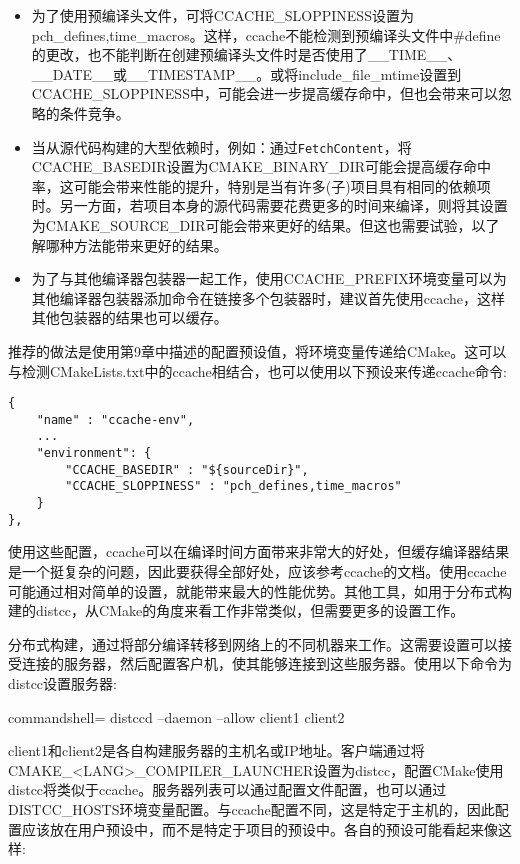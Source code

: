 \begin{itemize}
\item 
为了使用预编译头文件，可将CCACHE\_SLOPPINESS设置为pch\_defines,time\_macros。这样，ccache不能检测到预编译头文件中\#define的更改，也不能判断在创建预编译头文件时是否使用了\_\_TIME\_\_、\_\_DATE\_\_或\_\_TIMESTAMP\_\_。或将include\_file\_mtime设置到CCACHE\_SLOPPINESS中，可能会进一步提高缓存命中，但也会带来可以忽略的条件竞争。

\item 
当从源代码构建的大型依赖时，例如：通过\texttt{FetchContent}，将CCACHE\_BASEDIR设置为CMAKE\_BINARY\_DIR可能会提高缓存命中率，这可能会带来性能的提升，特别是当有许多(子)项目具有相同的依赖项时。另一方面，若项目本身的源代码需要花费更多的时间来编译，则将其设置为CMAKE\_SOURCE\_DIR可能会带来更好的结果。但这也需要试验，以了解哪种方法能带来更好的结果。

\item 
为了与其他编译器包装器一起工作，使用CCACHE\_PREFIX环境变量可以为其他编译器包装器添加命令在链接多个包装器时，建议首先使用ccache，这样其他包装器的结果也可以缓存。
\end{itemize}

推荐的做法是使用第9章中描述的配置预设值，将环境变量传递给CMake。这可以与检测CMakeLists.txt中的ccache相结合，也可以使用以下预设来传递ccache命令:

\begin{lstlisting}[style=styleCMake]
{
	"name" : "ccache-env",
	...
	"environment": {
		"CCACHE_BASEDIR" : "${sourceDir}",
		"CCACHE_SLOPPINESS" : "pch_defines,time_macros"
	}
},
\end{lstlisting}

使用这些配置，ccache可以在编译时间方面带来非常大的好处，但缓存编译器结果是一个挺复杂的问题，因此要获得全部好处，应该参考ccache的文档。使用ccache可能通过相对简单的设置，就能带来最大的性能优势。其他工具，如用于分布式构建的distcc，从CMake的角度来看工作非常类似，但需要更多的设置工作。


分布式构建，通过将部分编译转移到网络上的不同机器来工作。这需要设置可以接受连接的服务器，然后配置客户机，使其能够连接到这些服务器。使用以下命令为distcc设置服务器:

\begin{tcblisting}{commandshell={}}
distccd --daemon --allow client1 client2
\end{tcblisting}

client1和client2是各自构建服务器的主机名或IP地址。客户端通过将CMAKE\_<LANG>\_COMPILER\_LAUNCHER设置为distcc，配置CMake使用distcc将类似于ccache。服务器列表可以通过配置文件配置，也可以通过DISTCC\_HOSTS环境变量配置。与ccache配置不同，这是特定于主机的，因此配置应该放在用户预设中，而不是特定于项目的预设中。各自的预设可能看起来像这样:

